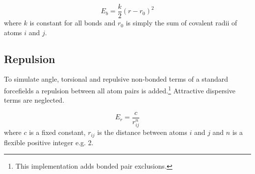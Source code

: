 \documentclass[10pt]{article}
\begin{document}
\begin{equation}
    E_{b} = \frac{k}{2}(r - r_0)^2
\end{equation}
where $k$ is constant for all bonds and $r_0$ is simply the sum of covalent
radii of atoms $i$ and $j$.

\subsection{Repulsion}
To simulate angle, torsional and repulsive non-bonded terms of a standard forcefields
a repulsion between all atom pairs is added.\footnote{This implementation adds
bonded pair exclusions.} Attractive dispersive terms are neglected.

\begin{equation}
    E_{r} = \frac{c}{r_{ij}^n}
\end{equation}
where $c$ is a fixed constant, $r_{ij}$ is the distance between atoms $i$ and
$j$ and $n$ is a flexible positive integer e.g. 2.
\end{document}
